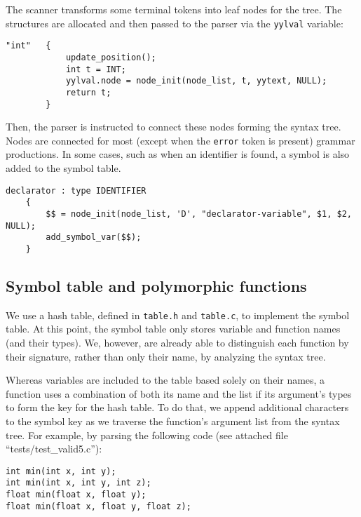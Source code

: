 \documentclass[12pt]{article}
\begin{document}
The scanner transforms some terminal tokens into leaf nodes for the tree. The structures
are allocated and then passed to the parser via the \texttt{yylval} variable:

\begin{lstlisting}[caption={Example of a lexer rule where a leaf node is created.
This procedure is preformed for
all data types, identifiers and constants.},captionpos=b]
"int"	{
			update_position();
			int t = INT;
			yylval.node = node_init(node_list, t, yytext, NULL);
			return t;
		}
\end{lstlisting}

Then, the parser is instructed to connect these nodes forming the syntax tree.
Nodes are connected for most (except when the \texttt{error} token is present)
grammar productions. In some cases, such as when an identifier is found, a symbol is also added
to the symbol table.

\begin{lstlisting}[caption={Example of a parser rule where nodes are connected.
This procedure is preformed for all productions, except error handlers. Here, a symbol
is also added to the symbol table through the function \texttt{add\_symbol\_var}},captionpos=b]
declarator : type IDENTIFIER 
	{
		$$ = node_init(node_list, 'D', "declarator-variable", $1, $2, NULL);
		add_symbol_var($$);
	}
\end{lstlisting}

\subsection{Symbol table and polymorphic functions}
We use a hash table, defined in \texttt{table.h} and \texttt{table.c}, to implement the symbol
table. At this point, the symbol table only stores variable and function names (and their types).
We, however, are already able to distinguish each function by their signature, rather than
only their name, by analyzing the syntax tree.

Whereas variables are included to the table based solely on their names, a function uses a
combination of both its name and the list if its argument's types to form the key for the hash
table. To do that, we append additional characters to the symbol key as we traverse the
function's argument list from the syntax tree. For example, by parsing the following code
(see attached file ``tests/test\_valid5.c''):

\begin{lstlisting}
int min(int x, int y);
int min(int x, int y, int z);
float min(float x, float y);
float min(float x, float y, float z);
\end{lstlisting}
\end{document}
